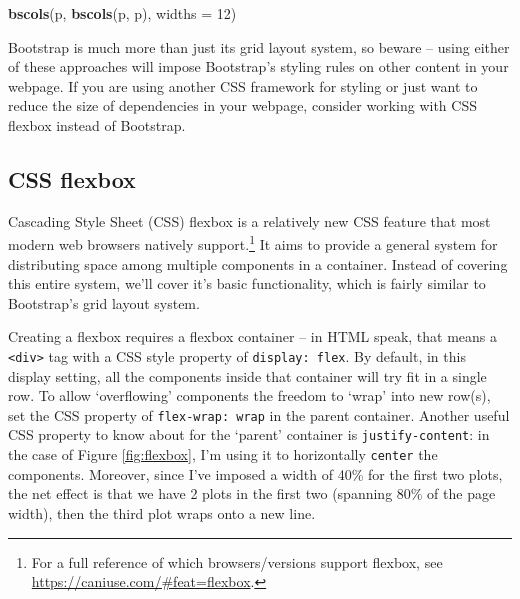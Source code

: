 \documentclass[
  12pt,
]{krantz}
\newenvironment{Shaded}{\begin{snugshade}}{\end{snugshade}}
\newcommand{\DataTypeTok}[1]{\textcolor[rgb]{0.13,0.29,0.53}{#1}}
\newcommand{\DecValTok}[1]{\textcolor[rgb]{0.00,0.00,0.81}{#1}}
\newcommand{\KeywordTok}[1]{\textcolor[rgb]{0.13,0.29,0.53}{\textbf{#1}}}
\newcommand{\NormalTok}[1]{#1}
\begin{document}
\begin{Shaded}
\begin{Highlighting}[]
\KeywordTok{bscols}\NormalTok{(p, }\KeywordTok{bscols}\NormalTok{(p, p), }\DataTypeTok{widths =} \DecValTok{12}\NormalTok{)}
\end{Highlighting}
\end{Shaded}

Bootstrap is much more than just its grid layout system, so beware -- using either of these approaches will impose Bootstrap's styling rules on other content in your webpage. If you are using another CSS framework for styling or just want to reduce the size of dependencies in your webpage, consider working with CSS flexbox instead of Bootstrap.

\hypertarget{css-flexbox}{%
\subsection{CSS flexbox}\label{css-flexbox}}

Cascading Style Sheet (CSS) flexbox is a relatively new CSS feature that most modern web browsers natively support.\footnote{For a full reference of which browsers/versions support flexbox, see \url{https://caniuse.com/\#feat=flexbox}.} It aims to provide a general system for distributing space among multiple components in a container. Instead of covering this entire system, we'll cover it's basic functionality, which is fairly similar to Bootstrap's grid layout system.

Creating a flexbox requires a flexbox container -- in HTML speak, that means a \texttt{\textless{}div\textgreater{}} tag with a CSS style property of \texttt{display:\ flex}. By default, in this display setting, all the components inside that container will try fit in a single row. To allow `overflowing' components the freedom to `wrap' into new row(s), set the CSS property of \texttt{flex-wrap:\ wrap} in the parent container. Another useful CSS property to know about for the `parent' container is \texttt{justify-content}: in the case of Figure \ref{fig:flexbox}, I'm using it to horizontally \texttt{center} the components. Moreover, since I've imposed a width of 40\% for the first two plots, the net effect is that we have 2 plots in the first two (spanning 80\% of the page width), then the third plot wraps onto a new line.
\end{document}
